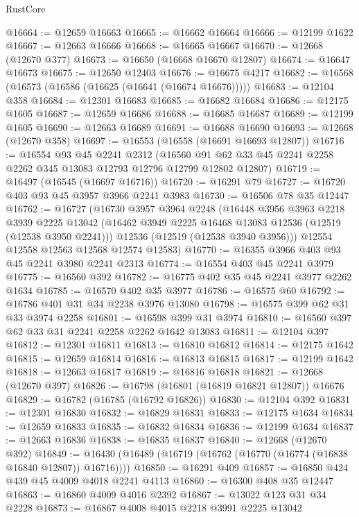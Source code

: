 \begin{lexlean}{RustCore}
\begin{coremodule}
@16664 := @12659 @16663
@16665 := @16662 @16664
@16666 := @12199 @1622
@16667 := @12663 @16666
@16668 := @16665 @16667
@16670 := @12668 (@12670 @377)
@16673 := @16650 (@16668 @16670 @12807)
@16674 := @16647 @16673
@16675 := @12650 @12403
@16676 := @16675 @4217
@16682 := @16568 (@16573 (@16586 (@16625 (@16641 (@16674 @16676)))))
@16683 := @12104 @358
@16684 := @12301 @16683
@16685 := @16682 @16684
@16686 := @12175 @1605
@16687 := @12659 @16686
@16688 := @16685 @16687
@16689 := @12199 @1605
@16690 := @12663 @16689
@16691 := @16688 @16690
@16693 := @12668 (@12670 @358)
@16697 := @16553 (@16558 (@16691 @16693 @12807))
@16716 := @16554
    @93
    @45
    @2241
    @2312
    (@16560 @91 @62 @33 @45 @2241 @2258 @2262 @345 @13083 @12793 @12796 @12799 @12802 @12807)
@16719 := @16497 (@16545 (@16697 @16716))
@16720 := @16291 @79
@16727 := @16720 @403 @93 @45 @3957 @3966 @2241 @3983
@16730 := @16506 @78 @35 @12447
@16762 := @16727
    (@16730
      @3957
      @3964
      @2248
      (@16448
        @3956
        @3963
        @2218
        @3939
        @2225
        @13042
        (@16462 @3949 @2225 @16468 @13083 @12536 (@12519 (@12538 @3950 @2241)))
        @12536
        (@12519 (@12538 @3940 @3956)))
      @12554
      @12558
      @12563
      @12568
      @12574
      @12583)
@16770 := @16355 @3966 @403 @93 @45 @2241 @3980 @2241 @2313
@16774 := @16554 @403 @45 @2241 @3979
@16775 := @16560 @392
@16782 := @16775 @402 @35 @45 @2241 @3977 @2262 @1634
@16785 := @16570 @402 @35 @3977
@16786 := @16575 @60
@16792 := @16786 @401 @31 @34 @2238 @3976 @13080
@16798 := @16575 @399 @62 @31 @33 @3974 @2258
@16801 := @16598 @399 @31 @3974
@16810 := @16560 @397 @62 @33 @31 @2241 @2258 @2262 @1642 @13083
@16811 := @12104 @397
@16812 := @12301 @16811
@16813 := @16810 @16812
@16814 := @12175 @1642
@16815 := @12659 @16814
@16816 := @16813 @16815
@16817 := @12199 @1642
@16818 := @12663 @16817
@16819 := @16816 @16818
@16821 := @12668 (@12670 @397)
@16826 := @16798 (@16801 (@16819 @16821 @12807)) @16676
@16829 := @16782 (@16785 (@16792 @16826))
@16830 := @12104 @392
@16831 := @12301 @16830
@16832 := @16829 @16831
@16833 := @12175 @1634
@16834 := @12659 @16833
@16835 := @16832 @16834
@16836 := @12199 @1634
@16837 := @12663 @16836
@16838 := @16835 @16837
@16840 := @12668 (@12670 @392)
@16849 := @16430 (@16489 (@16719 (@16762 (@16770 (@16774 (@16838 @16840 @12807)) @16716))))
@16850 := @16291 @409
@16857 := @16850 @424 @439 @45 @4009 @4018 @2241 @4113
@16860 := @16300 @408 @35 @12447
@16863 := @16860 @4009 @4016 @2392
@16867 := @13022 @123 @31 @34 @2228
@16873 := @16867 @4008 @4015 @2218 @3991 @2225 @13042

\end{coremodule}
\end{lexlean}
